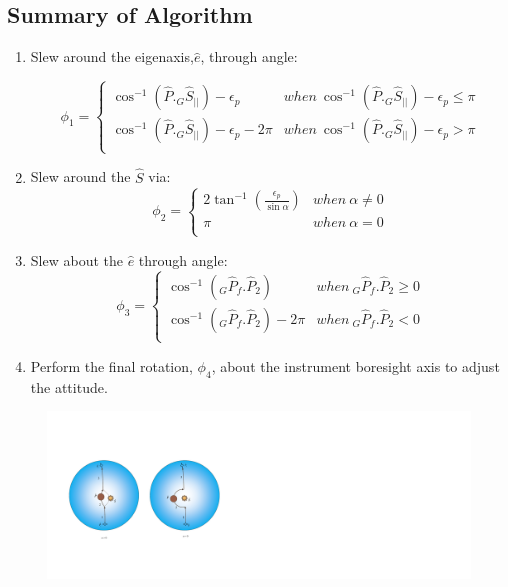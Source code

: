 \documentclass[letterpaper, preprint, paper,11pt]{AAS}	%
\begin{document}
	\subsection{Summary of Algorithm} 
		
		\begin{enumerate}
			\item Slew around the eigenaxis,$\hat{e}$, through angle:
			
			\begin{equation}\label{phi1}
				\phi_1=\left\{
				\begin{array}{ll}
				\cos^{-1}(\hat{P}._G\hat{S}_{||})-\epsilon_p& when\  \cos^{-1}(\hat{P}._G\hat{S}_{||})-\epsilon_p\leq \pi\\
				\cos^{-1}(\hat{P}._G\hat{S}_{||})-\epsilon_p-2\pi& when\ \cos^{-1}(\hat{P}._G\hat{S}_{||})-\epsilon_p>\pi\\
				\end{array}
				\right.
			\end{equation}
			\item Slew around the $\hat{S}$ via:
			\begin{equation}\label{phi2}
				\phi_2=\left\{
				\begin{array}{ll}
				2\tan^{-1}(\frac{\epsilon_p}{\sin\alpha})& when\  \alpha\neq 0\\
				\pi& when\ \alpha=0\\
				\end{array}
				\right.
			\end{equation}
			\item Slew about the $\hat{e}$ through angle:
			\begin{equation}\label{phi3}
				\phi_3=\left\{
				\begin{array}{ll}
				\cos^{-1}(_G\hat{P}_f.\hat{P}_2)& when\  _G\hat{P}_f.\hat{P}_2\geq 0\\
				\cos^{-1}(_G\hat{P}_f.\hat{P}_2)-2\pi& when\ _G\hat{P}_f.\hat{P}_2<0\\
				\end{array}
				\right.
			\end{equation}
			
			\item Perform the final rotation, $\phi_4$, about the instrument boresight axis to adjust the attitude. 
		\end{enumerate}
		\begin{figure}[H]
			\begin{center}
			\includegraphics[width=6in]{./Figures/SASSchematic3}
			\end{center}
		\end{figure}
\end{document}
